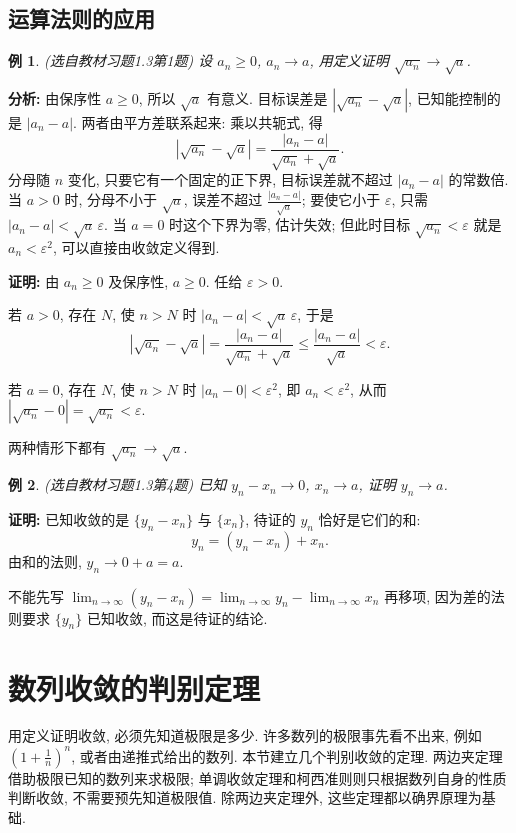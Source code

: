 \documentclass[UTF8,openany]{ctexbook}
\theoremstyle{chinesetextbook}
\newtheorem{example}{例}[section]
\newenvironment{cnproof}{\par\indent\textbf{证明:} \ignorespaces}{\par}
\begin{document}
\subsection{运算法则的应用}
\begin{example}
\textnormal{(选自教材习题1.3第1题)} 设 $a_n\ge0$, $a_n\to a$, 用定义证明 $\sqrt{a_n}\to\sqrt a$.
\end{example}
\par\indent\textbf{分析:} 由保序性 $a\ge0$, 所以 $\sqrt a$ 有意义. 目标误差是 $|\sqrt{a_n}-\sqrt a|$, 已知能控制的是 $|a_n-a|$. 两者由平方差联系起来: 乘以共轭式, 得
\[
|\sqrt{a_n}-\sqrt a|=\frac{|a_n-a|}{\sqrt{a_n}+\sqrt a}.
\]
分母随 $n$ 变化, 只要它有一个固定的正下界, 目标误差就不超过 $|a_n-a|$ 的常数倍. 当 $a>0$ 时, 分母不小于 $\sqrt a$, 误差不超过 $\displaystyle\frac{|a_n-a|}{\sqrt a}$; 要使它小于 $\varepsilon$, 只需 $|a_n-a|<\sqrt a\,\varepsilon$. 当 $a=0$ 时这个下界为零, 估计失效; 但此时目标 $\sqrt{a_n}<\varepsilon$ 就是 $a_n<\varepsilon^2$, 可以直接由收敛定义得到.
\begin{cnproof}
由 $a_n\ge0$ 及保序性, $a\ge0$. 任给 $\varepsilon>0$.

若 $a>0$, 存在 $N$, 使 $n>N$ 时 $|a_n-a|<\sqrt a\,\varepsilon$, 于是
\[
|\sqrt{a_n}-\sqrt a|=\frac{|a_n-a|}{\sqrt{a_n}+\sqrt a}\le\frac{|a_n-a|}{\sqrt a}<\varepsilon.
\]

若 $a=0$, 存在 $N$, 使 $n>N$ 时 $|a_n-0|<\varepsilon^2$, 即 $a_n<\varepsilon^2$, 从而 $|\sqrt{a_n}-0|=\sqrt{a_n}<\varepsilon$.

两种情形下都有 $\sqrt{a_n}\to\sqrt a$.
\end{cnproof}
\begin{example}
\textnormal{(选自教材习题1.3第4题)} 已知 $y_n-x_n\to0$, $x_n\to a$, 证明 $y_n\to a$.
\end{example}
\begin{cnproof}
已知收敛的是 $\{y_n-x_n\}$ 与 $\{x_n\}$, 待证的 $y_n$ 恰好是它们的和:
\[
y_n=(y_n-x_n)+x_n.
\]
由和的法则, $y_n\to0+a=a$.
\end{cnproof}
不能先写 $\displaystyle\lim_{n\to\infty}(y_n-x_n)=\lim_{n\to\infty}y_n-\lim_{n\to\infty}x_n$ 再移项, 因为差的法则要求 $\{y_n\}$ 已知收敛, 而这是待证的结论.
\section{数列收敛的判别定理}
用定义证明收敛, 必须先知道极限是多少. 许多数列的极限事先看不出来, 例如 $\displaystyle\left(1+\frac1n\right)^n$, 或者由递推式给出的数列. 本节建立几个判别收敛的定理. 两边夹定理借助极限已知的数列来求极限; 单调收敛定理和柯西准则则只根据数列自身的性质判断收敛, 不需要预先知道极限值. 除两边夹定理外, 这些定理都以确界原理为基础.
\end{document}
